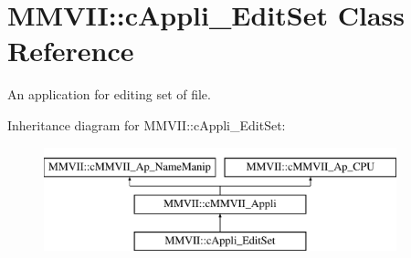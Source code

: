 \hypertarget{classMMVII_1_1cAppli__EditSet}{}\section{M\+M\+V\+II\+:\+:c\+Appli\+\_\+\+Edit\+Set Class Reference}
\label{classMMVII_1_1cAppli__EditSet}


An application for editing set of file.  


Inheritance diagram for M\+M\+V\+II\+:\+:c\+Appli\+\_\+\+Edit\+Set\+:\begin{figure}[H]
\begin{center}
\leavevmode
\includegraphics[height=3.000000cm]{classMMVII_1_1cAppli__EditSet}
\end{center}
\end{figure}
